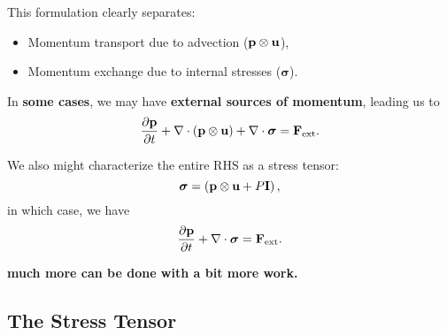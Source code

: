 This formulation clearly separates:
\begin{itemize}
    \item Momentum transport due to advection (${\bf p} \otimes {\bf u}$),
    \item Momentum exchange due to internal stresses ($\boldsymbol{\sigma}$).
\end{itemize}

In \textbf{some cases}, we may have \textbf{external sources of momentum}, leading us to
\[
\frac{\partial {\bf p}}{\partial t} + \nabla \cdot ({\bf p} \otimes {\bf u}) + \nabla \cdot \boldsymbol{\sigma} = {\bf F}_{\rm ext}.
\]
\begin{remark}
    We also might characterize the entire RHS as a stress tensor:
    \[
    \boldsymbol{\sigma} = \left({\bf p} \otimes {\bf u} + P{\bf I}\right),
    \]
    in which case, we have
    \[
    \frac{\partial {\bf p}}{\partial t} + \nabla \cdot \boldsymbol{\sigma} ={\bf F}_{\rm ext}.
    \]
\end{remark}
\textbf{much more can be done with a bit more work.}

\subsection{The Stress Tensor}

